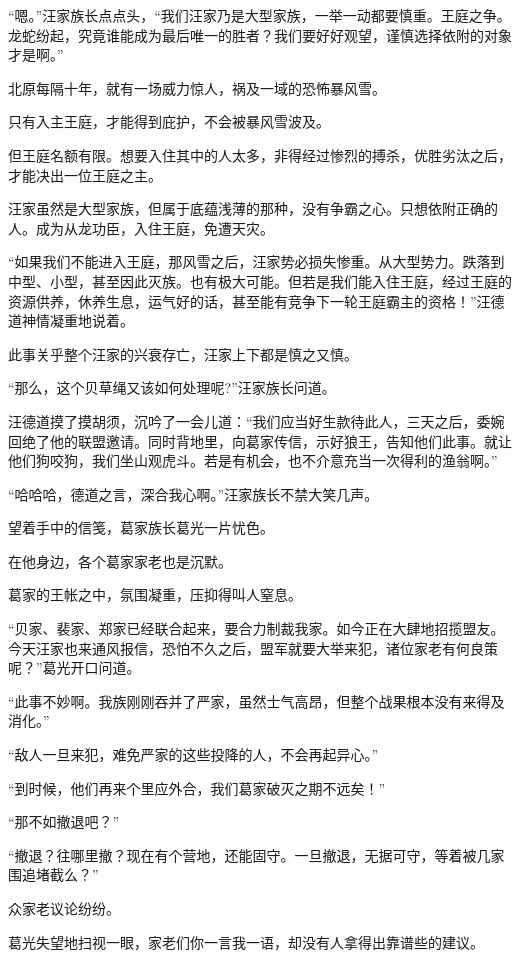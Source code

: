 \begin{this_body}
“嗯。”汪家族长点点头，“我们汪家乃是大型家族，一举一动都要慎重。王庭之争。龙蛇纷起，究竟谁能成为最后唯一的胜者？我们要好好观望，谨慎选择依附的对象才是啊。”

北原每隔十年，就有一场威力惊人，祸及一域的恐怖暴风雪。

只有入主王庭，才能得到庇护，不会被暴风雪波及。

但王庭名额有限。想要入住其中的人太多，非得经过惨烈的搏杀，优胜劣汰之后，才能决出一位王庭之主。

汪家虽然是大型家族，但属于底蕴浅薄的那种，没有争霸之心。只想依附正确的人。成为从龙功臣，入住王庭，免遭天灾。

“如果我们不能进入王庭，那风雪之后，汪家势必损失惨重。从大型势力。跌落到中型、小型，甚至因此灭族。也有极大可能。但若是我们能入住王庭，经过王庭的资源供养，休养生息，运气好的话，甚至能有竞争下一轮王庭霸主的资格！”汪德道神情凝重地说着。

此事关乎整个汪家的兴衰存亡，汪家上下都是慎之又慎。

“那么，这个贝草绳又该如何处理呢?”汪家族长问道。

汪德道摸了摸胡须，沉吟了一会儿道：“我们应当好生款待此人，三天之后，委婉回绝了他的联盟邀请。同时背地里，向葛家传信，示好狼王，告知他们此事。就让他们狗咬狗，我们坐山观虎斗。若是有机会，也不介意充当一次得利的渔翁啊。”

“哈哈哈，德道之言，深合我心啊。”汪家族长不禁大笑几声。

望着手中的信笺，葛家族长葛光一片忧色。

在他身边，各个葛家家老也是沉默。

葛家的王帐之中，氛围凝重，压抑得叫人窒息。

“贝家、裴家、郑家已经联合起来，要合力制裁我家。如今正在大肆地招揽盟友。今天汪家也来通风报信，恐怕不久之后，盟军就要大举来犯，诸位家老有何良策呢？”葛光开口问道。

“此事不妙啊。我族刚刚吞并了严家，虽然士气高昂，但整个战果根本没有来得及消化。”

“敌人一旦来犯，难免严家的这些投降的人，不会再起异心。”

“到时候，他们再来个里应外合，我们葛家破灭之期不远矣！”

“那不如撤退吧？”

“撤退？往哪里撤？现在有个营地，还能固守。一旦撤退，无据可守，等着被几家围追堵截么？”

众家老议论纷纷。

葛光失望地扫视一眼，家老们你一言我一语，却没有人拿得出靠谱些的建议。


\end{this_body}
